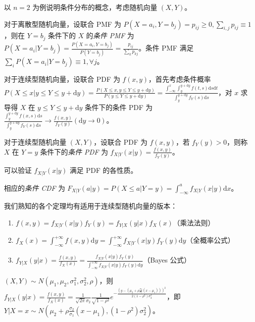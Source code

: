 \documentclass[../main.tex]{subfiles}
\begin{document}
以 $n=2$ 为例说明条件分布的概念，考虑随机向量 $(X,Y)$。

对于离散型随机向量，设联合 PMF 为 $P(X=a_i,Y=b_j)=p_{ij}\geq0,\sum_{i,j}p_{ij}\equiv1$，则在 $Y=b_j$ 条件下的 $X$ 的\emph{条件 PMF} 为 $P(X=a_i|Y=b_j)=\frac{P(X=a_i,Y=b_j)}{P(Y=b_j)}=\frac{p_{ij}}{\sum_kp_{kj}}$。条件 PMF 满足 $\sum_iP(X=a_i|Y=b_j)\equiv1,\forall j$。

对于连续型随机向量，设联合 PDF 为 $f(x,y)$，首先考虑条件概率 $P(X\leq x|y\leq Y\leq y+\mathrm dy)=\frac{P(X\leq x,y\leq Y\leq y+\mathrm dy)}{P(y\leq Y\leq y+\mathrm dy)}=\frac{\int_{-\infty}^x\int_y^{y+\mathrm dy}f(t,s)\mathrm ds\mathrm dt}{\int_y^{y+\mathrm dy}f_Y(s)\mathrm ds}$，对 $x$ 求导得 $X$ 在 $y\leq Y\leq y+\mathrm dy$ 条件下的条件 PDF 为 $\frac{\int_y^{y+\mathrm dy}f(x,s)\mathrm ds}{\int_y^{y+\mathrm dy}f_Y(s)\mathrm ds}\rightarrow\frac{f(x,y)}{f_Y(y)}(\mathrm dy\rightarrow 0)$。

\begin{definition}\label{def:3.5.1}
对于连续型随机向量 $(X,Y)$，设联合 PDF 为 $f(x,y)$，若 $f_Y(y)>0$，则称 $X$ 在 $Y=y$ 条件下的\emph{条件 PDF} 为 $f_{X|Y}(x|y)=\frac{f(x,y)}{f_Y(y)}$。
\end{definition}

可以验证 $f_{X|Y}(x|y)$ 满足 PDF 的各性质。

相应的\emph{条件 CDF} 为 $F_{X|Y}(a|y)=P(X\leq a|Y=y)=\int_{-\infty}^af_{X|Y}(x|y)\mathrm dx$。

我们熟知的各个定理均有适用于连续型随机向量的版本：
\begin{enumerate}
    \item $f(x,y)=f_{X|Y}(x|y)f_Y(y)=f_{Y|X}(y|x)f_X(x)$（乘法法则）
    \item $f_X(x)=\int_{-\infty}^{+\infty}f(x,y)\mathrm dy=\int_{-\infty}^{+\infty}f_{X|Y}(x|y)f_Y(y)\mathrm dy$（全概率公式）
    \item $f_{Y|X}(y|x)=\frac{f(x,y)}{f_X(x)}=\frac{f_{X|Y}(x|y)f_Y(y)}{\int_{-\infty}^{+\infty}f_{X|Y}(x|y)f_Y(y)\mathrm dy}$（Bayes 公式）
\end{enumerate}

\begin{example}
$(X,Y)\sim N(\mu_1,\mu_2,\sigma_1^2,\sigma_2^2,\rho)$，则 $f_{Y|X}(y|x)=\frac{f(x,y)}{f_X(x)}=\frac{1}{\sqrt{2\pi}\sigma_2}\frac{1}{\sqrt{1-\rho^2}}e^{-\frac{(y-(\mu_2+\rho\frac{\sigma_2}{\sigma_1}(x-\mu_1)))^2}{2(1-\rho^2)\sigma_2^2}}$，即 $Y|X=x\sim N(\mu_2+\rho\frac{\sigma_2}{\sigma_1}(x-\mu_1),(1-\rho^2)\sigma_2^2)$。
\end{example}
\end{document}
